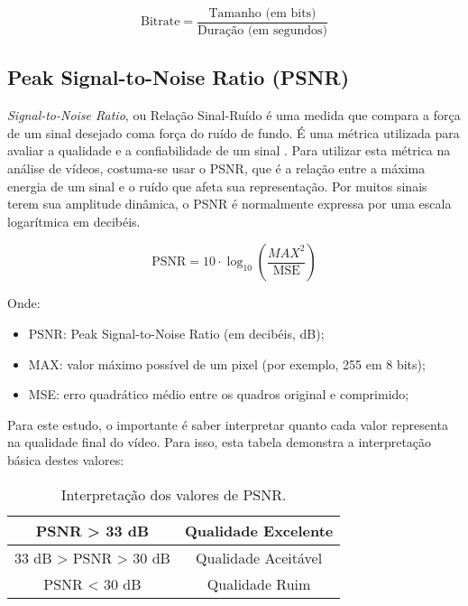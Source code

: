 \[
\text{Bitrate} = \frac{\text{Tamanho (em bits)}}{\text{Duração (em segundos)}}
\]

\subsection{Peak Signal-to-Noise Ratio (PSNR)}

\textit{Signal-to-Noise Ratio}, ou Relação Sinal-Ruído é uma medida que compara a força
de um sinal desejado coma força do ruído de fundo. É uma métrica utilizada para avaliar
a qualidade e a confiabilidade de um sinal \cite{gupta2006data}. Para utilizar esta
métrica na análise de vídeos, costuma-se usar o \acrshort{PSNR}, que é a relação entre 
a máxima energia de um sinal e o ruído que afeta sua representação. Por muitos sinais
terem sua amplitude dinâmica, o \acrshort{PSNR} é normalmente expressa por uma escala
logarítmica em decibéis.

\[
\text{PSNR} = 10 \cdot \log_{10} \left( \frac{MAX^2}{\text{MSE}} \right)
\]

Onde:
\begin{itemize}
    \item  PSNR: Peak Signal-to-Noise Ratio (em decibéis, dB);
    \item MAX: valor máximo possível de um pixel (por exemplo, 255 em 8 bits);
    \item MSE: erro quadrático médio entre os quadros original e comprimido;
\end{itemize}

Para este estudo, o importante é saber interpretar quanto cada valor representa
na qualidade final do vídeo. Para isso, esta tabela demonstra a interpretação
básica destes valores:

\begin{table}[h]
    \centering
    \begin{tabular}{|c|c|}
        \hline
        PSNR > 33 dB  & Qualidade Excelente\\
        \hline
        33 dB > PSNR > 30 dB  & Qualidade Aceitável\\
        \hline
        PSNR < 30 dB  & Qualidade Ruim\\
        \hline
    \end{tabular}
    \caption{Interpretação dos valores de PSNR. \cite{Syahbana2011APSNR}}
    \label{tab:psnr}
\end{table}


